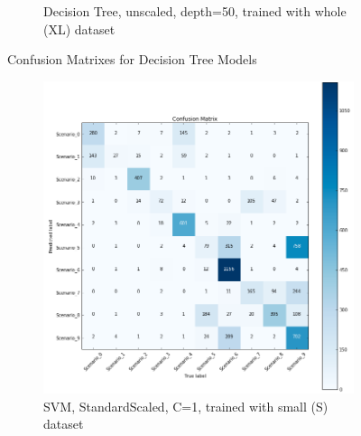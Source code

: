 \begin{figure}[!htb]
\begin{subfigure}[htb]{0.49\textwidth}
        \caption{Decision Tree, unscaled, depth=50, trained with whole (XL) dataset}
        \label{fig:knn_4}
    \end{subfigure}
    \caption{Confusion Matrixes for Decision Tree Models}
    \label{fig:confusiondtc}
\end{figure}
\begin{figure}[!htb]
    \captionsetup[subfigure]{justification=centering}
    \centering
    \begin{subfigure}[htb]{0.49\textwidth}
        \centering
        \includegraphics[width=\linewidth]{figures/svc_scaled_S_1}
        \caption{\ac{SVM}, StandardScaled, C=1, trained with small (S) dataset}
        \label{fig:knn_2}
    \end{subfigure}
    \begin{subfigure}[htb]{0.49\textwidth}
        \centering

\end{subfigure}
\end{figure}
